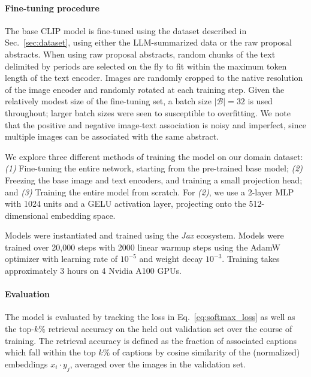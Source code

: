 \documentclass[10pt]{article} %
\newcommand{\package}[1]{\textsl{#1}\xspace}
\begin{document}
\paragraph*{Fine-tuning procedure}

The base CLIP model is fine-tuned using the dataset described in Sec.~\ref{sec:dataset}, using either the LLM-summarized data or the raw proposal abstracts. When using raw proposal abstracts, random chunks of the text delimited by periods are selected on the fly to fit within the maximum token length of the text encoder. Images are randomly cropped to the native resolution of the image encoder and randomly rotated at each training step. Given the relatively modest size of the fine-tuning set, a batch size $|\mathcal B| = 32$ is used throughout; larger batch sizes were seen to susceptible to overfitting. We note that the positive and negative image-text association is noisy and imperfect, since multiple images can be associated with the same abstract.

We explore three different methods of training the model on our domain dataset: \emph{(1)} Fine-tuning the entire network, starting from the pre-trained base model; \emph{(2)} Freezing the base image and text encoders, and training a small projection head; and \emph{(3)} Training the entire model from scratch. For \emph{(2)}, we use a 2-layer MLP with 1024 units and a GELU activation layer, projecting onto the 512-dimensional embedding space.

Models were instantiated and trained using the \package{Jax} \citep{jax2018github} ecosystem. Models were trained over 20,000 steps with 2000 linear warmup steps 
using the AdamW optimizer \citep{DBLP:conf/iclr/LoshchilovH19,DBLP:journals/corr/KingmaB14} with  %
learning rate of $10^{-5}$ and weight decay $10^{-3}$. Training takes approximately 3 hours on 4 Nvidia A100 GPUs.

\paragraph*{Evaluation}

The model is evaluated by tracking the loss in Eq.~\ref{eq:softmax_loss} as well as the top-$k\%$ retrieval accuracy on the held out validation set over the course of training. The retrieval accuracy is defined as the fraction of associated captions which fall within the top $k\%$ of captions by cosine similarity of the (normalized) embeddings $x_i \cdot y_j$, averaged over the images in the validation set.
\end{document}
